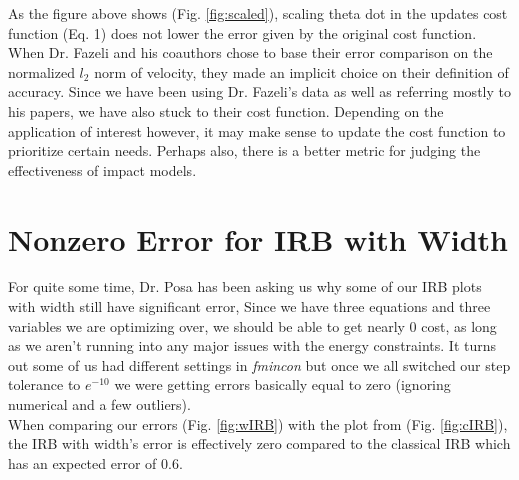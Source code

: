 \documentclass{article}
\begin{document}
\noindent As the figure above shows (Fig. \ref{fig:scaled}), scaling theta dot in the updates cost function (Eq. 1) does not lower the error given by the original cost function. When Dr. Fazeli and his coauthors chose to base their error comparison on the normalized $l_2$ norm of velocity, they made an implicit choice on their definition of accuracy. Since we have been using Dr. Fazeli's data as well as referring mostly to his papers, we have also stuck to their cost function. Depending on the application of interest however, it may make sense to update the cost function to prioritize certain needs. Perhaps also, there is a better metric for judging the effectiveness of impact models. 

\section{Nonzero Error for IRB with Width }
For quite some time, Dr. Posa has been asking us why some of our IRB plots with width still have significant error, Since we have three equations and three variables we are optimizing over, we should be able to get nearly 0 cost, as long as we aren't running into any major issues with the energy constraints. It turns out some of us had different settings in \textit{fmincon} but once we all switched our step tolerance to $e^{-10}$ we were getting errors basically equal to zero (ignoring numerical and a few outliers). \\

\noindent When comparing our errors (Fig. \ref{fig:wIRB}) with the plot from \citet{nimaPaper} (Fig. \ref{fig:cIRB}), the IRB with width's error is effectively zero compared to the classical IRB which has an expected error of 0.6. 
\end{document}
